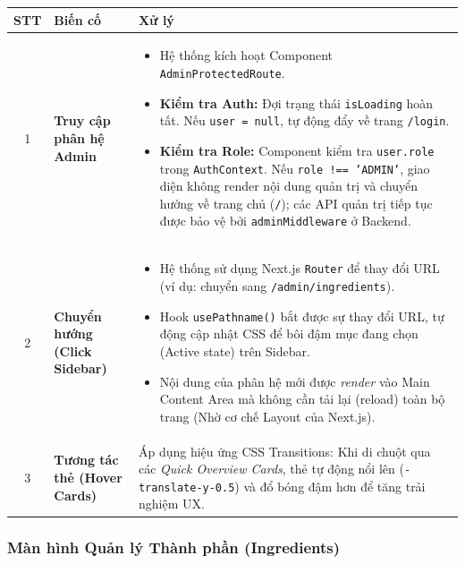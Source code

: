 \documentclass[12pt,a4paper]{article}
\begin{document}
\begin{center}
\renewcommand{\arraystretch}{1.5}
\begin{tabularx}{\textwidth}{|c|l|X|}
\hline
\rowcolor{blue!20}
\textbf{STT} & \textbf{Biến cố} & \textbf{Xử lý} \\ \hline

1 & \textbf{Truy cập phân hệ Admin} & 
\begin{itemize}
    \item Hệ thống kích hoạt Component \texttt{AdminProtectedRoute}.
    \item \textbf{Kiểm tra Auth:} Đợi trạng thái \texttt{isLoading} hoàn tất. Nếu \texttt{user = null}, tự động đẩy về trang \texttt{/login}.
    \item \textbf{Kiểm tra Role:} Component kiểm tra \texttt{user.role} trong \texttt{AuthContext}. Nếu \texttt{role !== 'ADMIN'}, giao diện không render nội dung quản trị và chuyển hướng về trang chủ (\texttt{/}); các API quản trị tiếp tục được bảo vệ bởi \texttt{adminMiddleware} ở Backend.
\end{itemize} \\ \hline

2 & \textbf{Chuyển hướng (Click Sidebar)} & 
\begin{itemize}
    \item Hệ thống sử dụng Next.js \texttt{Router} để thay đổi URL (ví dụ: chuyển sang \texttt{/admin/ingredients}).
    \item Hook \texttt{usePathname()} bắt được sự thay đổi URL, tự động cập nhật CSS để bôi đậm mục đang chọn (Active state) trên Sidebar.
    \item Nội dung của phân hệ mới được \textit{render} vào Main Content Area mà không cần tải lại (reload) toàn bộ trang (Nhờ cơ chế Layout của Next.js).
\end{itemize} \\ \hline

3 & \textbf{Tương tác thẻ (Hover Cards)} & Áp dụng hiệu ứng CSS Transitions: Khi di chuột qua các \textit{Quick Overview Cards}, thẻ tự động nổi lên (\texttt{-translate-y-0.5}) và đổ bóng đậm hơn để tăng trải nghiệm UX. \\ \hline

\end{tabularx}
\end{center}







\subsubsection{Màn hình Quản lý Thành phần (Ingredients)}
\end{document}

